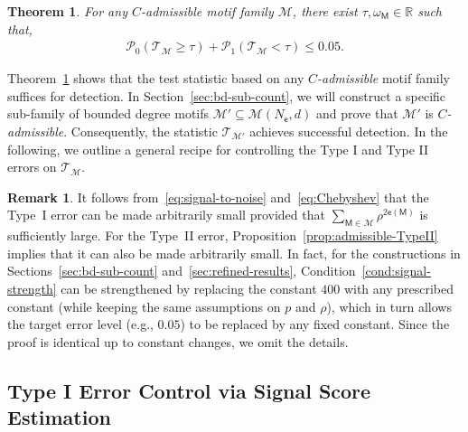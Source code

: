 \documentclass[letterpaper,11pt]{article}
\newtheorem{theorem}{Theorem}
\theoremstyle{definition}
\newtheorem{remark}{Remark}
\newcommand{\maM}{\mathcal{M}}
\newcommand{\maP}{\mathcal{P}}
\newcommand{\maT}{\mathcal{T}}
\newcommand{\en}{\mathsf{{e}}}
\newcommand{\pth}[1]{\left( #1 \right)}
\newcommand{\sfM}{{\mathsf{M}}}
\newcommand{\sfe}{{\mathsf{e}}}
\begin{document}
\begin{theorem}\label{thm:admissible}
    For any \emph{$C$-admissible} motif family $\maM$, there exist $\tau,\omega_\sfM\in \mathbb{R}$ such that,
    \begin{align*}
        \maP_0\pth{\maT_\maM\ge\tau}+\maP_1(\maT_\maM< \tau)\le 0.05.
    \end{align*}
\end{theorem}
Theorem~\ref{thm:admissible} shows that the test statistic based on any \emph{$C$-admissible} motif family suffices for detection. In Section~\ref{sec:bd-sub-count}, we will construct a specific sub-family of bounded degree motifs $\maM'\subseteq \maM(N_\sfe,d)$ and prove that $\maM'$ is \emph{$C$-admissible}. Consequently, the statistic $\maT_{\maM'}$ achieves successful detection. In the following, we outline a general recipe for controlling the Type I and Type II errors on $\maT_\maM$.

\begin{remark}\label{rmk:005}
It follows from~\eqref{eq:signal-to-noise} and~\eqref{eq:Chebyshev} that the Type~I error can be made arbitrarily small provided that
$\sum_{\sfM\in\maM}\rho^{2\en(\sfM)}$ is sufficiently large.
For the Type~II error, Proposition~\ref{prop:admissible-TypeII} implies that it can also be made arbitrarily small.
In fact, for the constructions in Sections~\ref{sec:bd-sub-count} and~\ref{sec:refined-results}, Condition~\ref{cond:signal-strength} can be strengthened by replacing the constant $400$ with any prescribed constant (while keeping the same assumptions on $p$ and $\rho$), which in turn allows the target error level (e.g., $0.05$) to be replaced by any fixed constant.
Since the proof is identical up to constant changes, we omit the details.
\end{remark}


\subsection{Type I Error Control via Signal Score Estimation}
\end{document}
